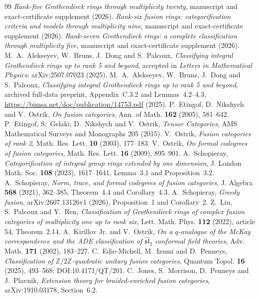 \documentclass[11pt,reqno]{amsart}
\theoremstyle{definition}
\theoremstyle{remark}
\newcommand{\Z}{\mathbb Z}
\begin{document}
\begin{thebibliography}{99}
 \emph{Rank-five Grothendieck rings through multiplicity twenty}, manuscript and exact-certificate supplement (2026).
 \emph{Rank-six fusion rings: categorification criteria and models through multiplicity nine}, manuscript and exact-certificate supplement (2026).
 \emph{Rank-seven Grothendieck rings: a complete classification through multiplicity five}, manuscript and exact-certificate supplement (2026).
 M.~A.~Alekseyev, W.~Bruns, J.~Dong and S.~Palcoux, \emph{Classifying integral Grothendieck rings up to rank 5 and beyond}, accepted in \emph{Letters in Mathematical Physics}; arXiv:2507.07023 (2025).
 M.~A.~Alekseyev, W.~Bruns, J.~Dong and S.~Palcoux, \emph{Classifying integral Grothendieck rings up to rank 5 and beyond}, archived full-data preprint, Appendix~C.3.2 and Lemmas~4.2--4.3, \url{https://bimsa.net/doc/publication/14753.pdf} (2025).
 P.~Etingof, D.~Nikshych and V.~Ostrik, \emph{On fusion categories}, Ann. of Math. \textbf{162} (2005), 581--642.
 P.~Etingof, S.~Gelaki, D.~Nikshych and V.~Ostrik, \emph{Tensor Categories}, AMS Mathematical Surveys and Monographs 205 (2015).
 V.~Ostrik, \emph{Fusion categories of rank 2}, Math. Res. Lett. \textbf{10} (2003), 177--183.
 V.~Ostrik, \emph{On formal codegrees of fusion categories}, Math. Res. Lett. \textbf{16} (2009), 895--901.
 A.~Schopieray, \emph{Categorification of integral group rings extended by one dimension}, J. London Math. Soc. \textbf{108} (2023), 1617--1641, Lemma~3.1 and Proposition~3.2.
 A.~Schopieray, \emph{Norm, trace, and formal codegrees of fusion categories}, J. Algebra \textbf{568} (2021), 362--385, Theorem~4.4 and Corollary~4.3.
 A.~Schopieray, \emph{Greedy fusion}, arXiv:2607.13126v1 (2026), Proposition~1 and Corollary~2.
 Z.~Liu, S.~Palcoux and Y.~Ren, \emph{Classification of Grothendieck rings of complex fusion categories of multiplicity one up to rank six}, Lett. Math. Phys. \textbf{112} (2022), article 54, Theorem~2.14.
 A.~Kirillov Jr. and V.~Ostrik, \emph{On a $q$-analogue of the McKay correspondence and the ADE classification of $\widehat{\mathfrak{sl}}_2$ conformal field theories}, Adv. Math. \textbf{171} (2002), 183--227.
 C.~Edie-Michell, M.~Izumi and D.~Penneys, \emph{Classification of $\Z/2\Z$-quadratic unitary fusion categories}, Quantum Topol. \textbf{16} (2025), 493--568; DOI:10.4171/QT/201.
 C.~Jones, S.~Morrison, D.~Penneys and J.~Plavnik, \emph{Extension theory for braided-enriched fusion categories}, arXiv:1910.03178, Section~6.2.

\end{thebibliography}
\end{document}
